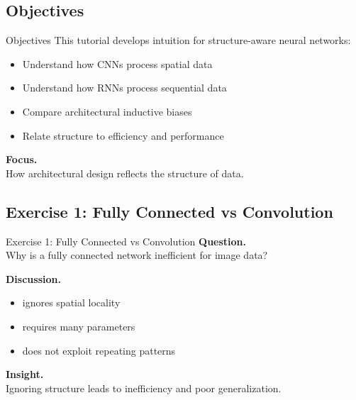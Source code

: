 \documentclass[aspectratio=169,11pt]{beamer}
\begin{document}
\subsection{Objectives}
\begin{frame}[t,allowframebreaks]{Objectives}
\small
This tutorial develops intuition for structure-aware neural networks:

\begin{itemize}
    \item Understand how CNNs process spatial data
    \item Understand how RNNs process sequential data
    \item Compare architectural inductive biases
    \item Relate structure to efficiency and performance
\end{itemize}

\textbf{Focus.}\\ How architectural design reflects the structure of data.
\end{frame}

\subsection{Exercise 1: Fully Connected vs Convolution}
\begin{frame}[t,allowframebreaks]{Exercise 1: Fully Connected vs Convolution}
\small
\textbf{Question.}\\ Why is a fully connected network inefficient for image data?

\textbf{Discussion.}\\ \begin{itemize}
    \item ignores spatial locality
    \item requires many parameters
    \item does not exploit repeating patterns
\end{itemize}

\textbf{Insight.}\\ Ignoring structure leads to inefficiency and poor generalization.
\end{frame}
\end{document}

